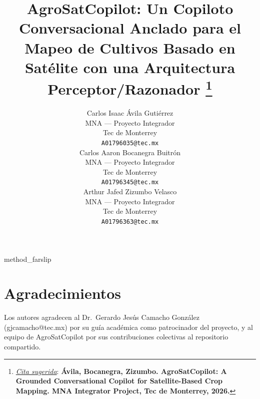 \documentclass{article}
\title{AgroSatCopilot: Un Copiloto Conversacional Anclado para el Mapeo
de Cultivos Basado en Satélite con una Arquitectura Perceptor/Razonador
\thanks{\textit{\underline{Cita sugerida}}: \textbf{\'Avila,
Bocanegra, Zizumbo. AgroSatCopilot: A Grounded Conversational Copilot
for Satellite-Based Crop Mapping. MNA Integrator Project, Tec de
Monterrey, 2026.}}
}
\author{
  Carlos Isaac \'Avila Guti\'errez \\
  MNA --- Proyecto Integrador \\
  Tec de Monterrey \\
  \texttt{A01796035@tec.mx} \\
  \And
  Carlos Aaron Bocanegra Buitr\'on \\
  MNA --- Proyecto Integrador \\
  Tec de Monterrey \\
  \texttt{A01796345@tec.mx} \\
  \And
  Arthur Jafed Zizumbo Velasco \\
  MNA --- Proyecto Integrador \\
  Tec de Monterrey \\
  \texttt{A01796363@tec.mx} \\
}
\begin{document}
\maketitle








{method_farslip}


\label{sec:farslip_transfer}




\section*{Agradecimientos}
Los autores agradecen al Dr.\ Gerardo Jes\'us Camacho Gonz\'alez
(gjcamacho@tec.mx) por su gu\'ia acad\'emica como patrocinador del
proyecto, y al equipo de AgroSatCopilot por sus contribuciones
colectivas al repositorio compartido.





\end{document}
